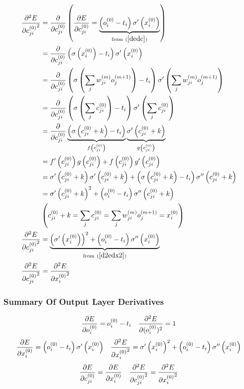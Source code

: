 \begin{align}
\pdv[2]{E}{{c_{ji}^{(0)}}} &=
\pdv{}{c_{ji}^{(0)}} 
\left(\pdv{E}{c_{ji}^{(0)}} = 
\underbrace{\left(o_{i}^{(0)} - t_{i} \right) \sigma^{\prime}\left(x_{i}^{(0)}\right)}
_{\text{from} \ (\ref{dedc})}
\right)
\\
&=\pdv{}{c_{ji}^{(0)}}\left(\sigma\left(x_{i}^{(0)}\right) - t_{i} \right) \sigma^{\prime}\left(x_{i}^{(0)}\right)
\\
&=\pdv{}{c_{ji}^{(0)}}\left(\sigma\left(\sum\limits_j {w_{ji}^{(m)}}{ o_{j}^{(m + 1)}}\right) - t_{i} \right) \sigma^{\prime}\left(\sum\limits_j {w_{ji}^{(m)}}{ o_{j}^{(m + 1)}}\right)
\\
&=\pdv{}{c_{ji}^{(0)}}\left(\sigma\left(\sum\limits_j {c_{ji}^{(0)}}\right) - t_{i} \right) \sigma^{\prime}\left(\sum\limits_j {c_{ji}^{(0)}}\right)
\\
&=\pdv{}{c_{ji}^{(0)}}
\underbrace{\left(\sigma\left({c_{ji}^{(0)}} + k\right) - t_{i} \right)}
_{f\left(c_{ji}^{(0)}\right)}
\underbrace{\sigma^{\prime}\left({c_{ji}^{(0)}} + k\right)}
_{g\left(c_{ji}^{(0)}\right)}
\\
&=f^{\prime}\left(c_{ji}^{(0)}\right)g\left(c_{ji}^{(0)}\right) + f\left(c_{ji}^{(0)}\right)g^{\prime}\left(c_{ji}^{(0)}\right)
\\
&=\sigma^{\prime}\left({c_{ji}^{(0)}} + k\right)\sigma^{\prime}\left({c_{ji}^{(0)}} + k\right) + 
\left(\sigma\left({c_{ji}^{(0)}} + k\right) - t_{i} \right)\sigma^{\prime\prime}\left({c_{ji}^{(0)}} + k\right)
\\
&=\sigma^{\prime}\left({c_{ji}^{(0)}} + k\right)^2 + 
\left(o_{i}^{(0)} - t_{i} \right)\sigma^{\prime\prime}\left({c_{ji}^{(0)}} + k\right)
\\
&\left(c_{ji}^{(0)} + k = \sum_j{c_{ji}^{(0)}} = \sum\limits_j {w_{ji}^{(m)}}{ o_{j}^{(m + 1)}} = x_{i}^{(0)} \right)
\\
\pdv[2]{E}{{c_{ji}^{(0)}}}&=
\underbrace{\left(\sigma^{\prime}\left(x_{i}^{(0)}\right)\right)^2 + 
\left(o_{i}^{(0)} - t_{i} \right)\sigma^{\prime\prime}\left(x_{i}^{(0)}\right)}
_{\text{from} \ (\ref{d2edx2})}
\\
\pdv[2]{E}{{c_{ji}^{(0)}}} &= \pdv[2]{E}{{x_{i}^{(0)}}}
\end{align}
\subsubsection{Summary Of Output Layer Derivatives}
\begin{align}
&\pdv{E}{o_{i}^{(0)}} = o_{i}^{(0)} - t_{i} 
&
\pdv[2]{E}{(o_{i}^{(0)})} = 1
\end{align}
\begin{align}
&\pdv{E}{x_{i}^{(0)}} = \left(o_{i}^{(0)} - t_{i}\right)\sigma^{\prime}\left(x_{i}^{(0)}\right)
& 
\pdv[2]{E}{{x_{i}^{(0)}}} = \sigma^{\prime}\left(x_{i}^{(0)}\right)^2 + \left(o_{i}^{(0)} - t_{i}\right)\sigma^{\prime\prime}\left(x_{i}^{(0)}\right)
\end{align}
\begin{align}
&\pdv{E}{{c_{ji}^{(0)}}} = \pdv{E}{{x_{i}^{(0)}}}
&
\pdv[2]{E}{{c_{ji}^{(0)}}} = \pdv[2]{E}{{x_{i}^{(0)}}}
\end{align}
